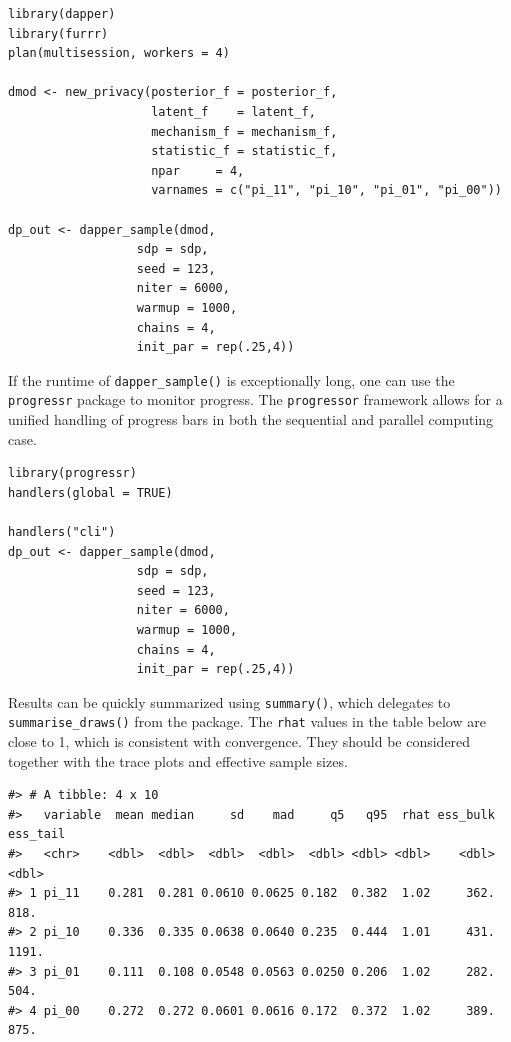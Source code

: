 \begin{verbatim}
library(dapper)
library(furrr)
plan(multisession, workers = 4)

dmod <- new_privacy(posterior_f = posterior_f,
                    latent_f    = latent_f,
                    mechanism_f = mechanism_f,
                    statistic_f = statistic_f,
                    npar     = 4,
                    varnames = c("pi_11", "pi_10", "pi_01", "pi_00"))
                  
dp_out <- dapper_sample(dmod,
                  sdp = sdp,
                  seed = 123,
                  niter = 6000,
                  warmup = 1000,
                  chains = 4,
                  init_par = rep(.25,4))
\end{verbatim}

If the runtime of \texttt{dapper\_sample()} is exceptionally long, one can
use the \texttt{progressr} package to monitor progress. The \texttt{progressor} framework
allows for a unified handling of progress bars in both the sequential and
parallel computing case.

\begin{verbatim}
library(progressr)
handlers(global = TRUE)

handlers("cli")
dp_out <- dapper_sample(dmod,
                  sdp = sdp,
                  seed = 123,
                  niter = 6000,
                  warmup = 1000,
                  chains = 4,
                  init_par = rep(.25,4))
\end{verbatim}

Results can be quickly summarized using \texttt{summary()}, which delegates to
\texttt{summarise\_draws()} from the  package. The \texttt{rhat} values in the table below are close
to 1, which is consistent with convergence. They should be considered together
with the trace plots and effective sample sizes.

\begin{verbatim}
#> # A tibble: 4 x 10
#>   variable  mean median     sd    mad     q5   q95  rhat ess_bulk ess_tail
#>   <chr>    <dbl>  <dbl>  <dbl>  <dbl>  <dbl> <dbl> <dbl>    <dbl>    <dbl>
#> 1 pi_11    0.281  0.281 0.0610 0.0625 0.182  0.382  1.02     362.     818.
#> 2 pi_10    0.336  0.335 0.0638 0.0640 0.235  0.444  1.01     431.    1191.
#> 3 pi_01    0.111  0.108 0.0548 0.0563 0.0250 0.206  1.02     282.     504.
#> 4 pi_00    0.272  0.272 0.0601 0.0616 0.172  0.372  1.02     389.     875.
\end{verbatim}

